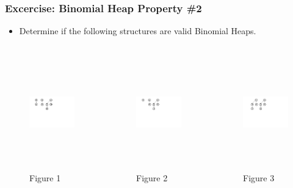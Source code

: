 \documentclass[13pt]{beamer}
\begin{document}
\begin{frame}
\frametitle{Excercise: Binomial Heap Property \#2}
  \begin{itemize}
    \item Determine if the following structures are valid Binomial Heaps.
  \end{itemize}

  \begin{columns}[T] %
    \begin{column}[T]{4.3cm} %
      \begin{figure}
        \caption{Figure 1}
        \includegraphics[height=5cm]{struct4.png}
      \end{figure}
      \centering
    \end{column}
    \begin{column}[T]{4.3cm} %
      \begin{figure}
        \caption{Figure 2}
        \includegraphics[height=5cm]{struct2.png}
      \end{figure}
    \end{column}
    \begin{column}[T]{4.3cm} %
      \begin{figure}
        \caption{Figure 3}
        \includegraphics[height=5cm]{struct1.png}
      \end{figure}
    \end{column}
  \end{columns}

\end{frame}
\end{document}
